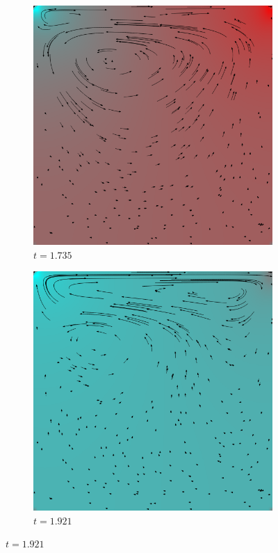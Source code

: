 \begin{figure}[!htb]
			\begin{subfigure}[b]{.5\textwidth}
				\includegraphics[scale = 0.28]{screenshots/periodic-01735.png}
				\caption{$t=1.735$}
			\end{subfigure}%
			\begin{subfigure}[b]{.5\textwidth}
				\includegraphics[scale = 0.28]{screenshots/periodic-01921.png}
				\caption{$t=1.921$}
			\end{subfigure}


\end{figure}
